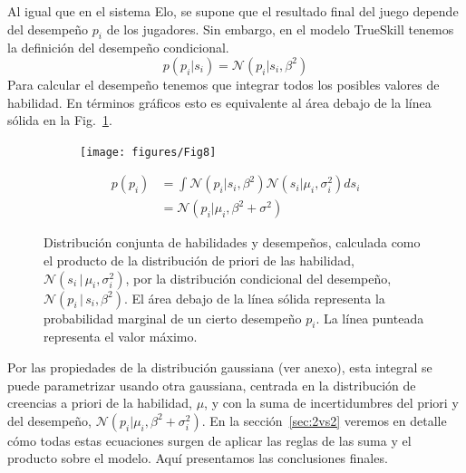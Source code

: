 \documentclass[a4paper,11pt]{book}
\newcommand{\N}{\mathcal{N}}
\theoremstyle{definition}
\begin{document}
Al igual que en el sistema Elo, se supone que el resultado final del juego depende del desempeño $p_i$ de los jugadores.
%
Sin embargo, en el modelo TrueSkill tenemos la definición del desempeño condicional.
%
\begin{equation}
p(p_i|s_i) = \N(p_i | s_i, \beta^2)
\end{equation}
%
Para calcular el desempeño tenemos que integrar todos los posibles valores de habilidad.
%
En términos gráficos esto es equivalente al área debajo de la línea sólida en la Fig.~\ref{paso_1_multiplicacion_normales}.
%
\begin{figure}[ht!]
\centering
\begin{subfigure}[c]{0.4\textwidth}
\centering
\texttt{[image: figures/Fig8]}
\end{subfigure}
\begin{subfigure}[c]{0.5\textwidth}
\begin{align*}\label{p.p_i}
p(p_i) & = \int \N(p_i | s_i, \beta^2) \N(s_i | \mu_i,\sigma_i^2) ds_i  \\
&= \N(p_i|\mu_i, \beta^2 + \sigma^2)
\end{align*}
\end{subfigure}
\caption{Distribución conjunta de habilidades y desempeños, calculada como el producto de la distribución de priori de las habilidad, $\N(s_i \, | \, \mu_i, \sigma_i^2)$, por la distribución condicional del desempeño, $\N(p_i \, | \, s_i, \beta^2)$.
%
El área debajo de la línea sólida representa la probabilidad marginal de un cierto desempeño $p_i$.
%
La línea punteada representa el valor máximo.
}
\label{paso_1_multiplicacion_normales}
\end{figure}
%
Por las propiedades de la distribución gaussiana (ver anexo), esta integral se puede parametrizar usando otra gaussiana, centrada en la distribución de creencias a priori de la habilidad, $\mu$, y con la suma de incertidumbres del priori y del desempeño, $\N(p_i | \mu_i, \beta^2 +\sigma_i^2)$.
%
En la sección~\ref{sec:2vs2} veremos en detalle cómo todas estas ecuaciones surgen de aplicar las reglas de las suma y el producto sobre el modelo.
%
Aquí presentamos las conclusiones finales.

\end{document}
